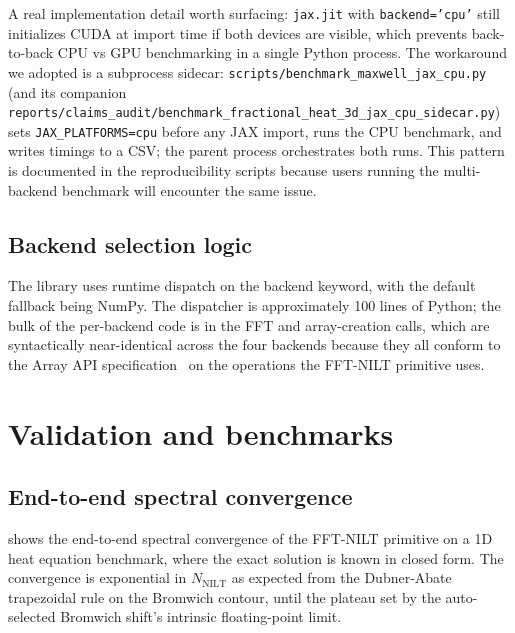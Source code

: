\documentclass[manuscript,review]{acmart}
\begin{document}
A real implementation detail worth surfacing: \texttt{jax.jit} with
\texttt{backend='cpu'} still initializes CUDA at import time if both
devices are visible, which prevents back-to-back CPU vs GPU
benchmarking in a single Python process. The workaround we adopted
is a subprocess sidecar:
\texttt{scripts/benchmark\_maxwell\_jax\_cpu.py} (and its companion
\texttt{reports/claims\_audit/benchmark\_fractional\_heat\_3d\_jax\_cpu\_sidecar.py})
sets \texttt{JAX\_PLATFORMS=cpu} before any JAX import, runs the
CPU benchmark, and writes timings to a CSV; the parent process
orchestrates both runs. This pattern is documented in the reproducibility scripts
because users running the multi-backend benchmark will encounter the
same issue.

\subsection{Backend selection logic}

The library uses runtime dispatch on the backend keyword, with the
default fallback being NumPy. The dispatcher is approximately 100
lines of Python; the bulk of the per-backend code is in the FFT and
array-creation calls, which are syntactically near-identical across
the four backends because they all conform to the Array API
specification~\cite{arrayapi2022} on the operations the FFT-NILT
primitive uses.

\section{Validation and benchmarks}\label{sec:benchmarks}

\subsection{End-to-end spectral convergence}\label{sec:bench-convergence}

 shows the end-to-end spectral convergence of
the FFT-NILT primitive on a 1D heat equation benchmark, where the
exact solution is known in closed form. The convergence is
exponential in $N_{\mathrm{NILT}}$ as expected from the
Dubner-Abate trapezoidal rule on the Bromwich contour, until the
plateau set by the auto-selected Bromwich shift's intrinsic
floating-point limit.
\end{document}
